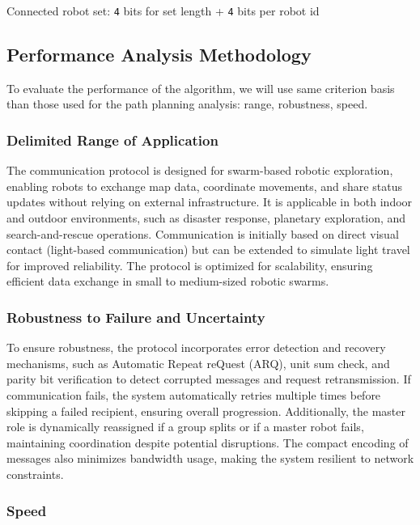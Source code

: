 \documentclass[../main.tex]{subfiles}
\begin{document}
Connected robot set:
\texttt{4} bits for set length + \texttt{4} bits per robot id


\subsection{Performance Analysis Methodology}

To evaluate the performance of the algorithm, we will use same criterion basis than those used for the path planning analysis: range, robustness, speed.

\subsubsection{Delimited Range of Application}

The communication protocol is designed for swarm-based robotic exploration, enabling robots to exchange map data, coordinate movements, and share status updates without relying on external infrastructure. It is applicable in both indoor and outdoor environments, such as disaster response, planetary exploration, and search-and-rescue operations. Communication is initially based on direct visual contact (light-based communication) but can be extended to simulate light travel for improved reliability. The protocol is optimized for scalability, ensuring efficient data exchange in small to medium-sized robotic swarms.

\subsubsection{Robustness to Failure and Uncertainty}

To ensure robustness, the protocol incorporates error detection and recovery mechanisms, such as Automatic Repeat reQuest (ARQ), unit sum check, and parity bit verification to detect corrupted messages and request retransmission. If communication fails, the system automatically retries multiple times before skipping a failed recipient, ensuring overall progression. Additionally, the master role is dynamically reassigned if a group splits or if a master robot fails, maintaining coordination despite potential disruptions. The compact encoding of messages also minimizes bandwidth usage, making the system resilient to network constraints.  


\subsubsection{Speed}
\end{document}
